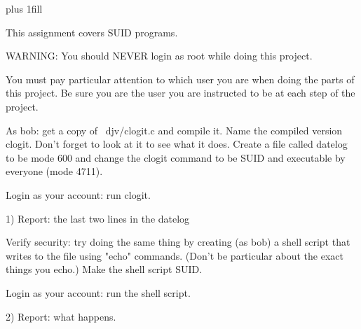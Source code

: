 
\rightskip=0pt plus 1fill

\parindent 0pt

This assignment covers SUID programs.

WARNING: You should NEVER login as root while doing this project.

You must pay particular attention to which user you are when
doing the parts of this project. Be sure you are the user
you are instructed to be at each step of the project.

As bob: get a copy of {\ltt{}~djv/clogit.c} and compile it.
Name the compiled version {\ltt{}clogit}.
Don't forget to look at it to see what it does.
Create a file called {\ltt{}datelog} to be mode 600 and
change the {\ltt{}clogit} command to be SUID and executable
by everyone (mode 4711).

Login as your account: run clogit.

1) Report: the last two lines in the datelog

Verify security: try doing the same thing by creating (as bob) a shell
script that writes to the file using "echo" commands.
(Don't be particular about the exact things you echo.)
Make the shell script SUID.

Login as your account: run the shell script.

2) Report: what happens.
\bye
